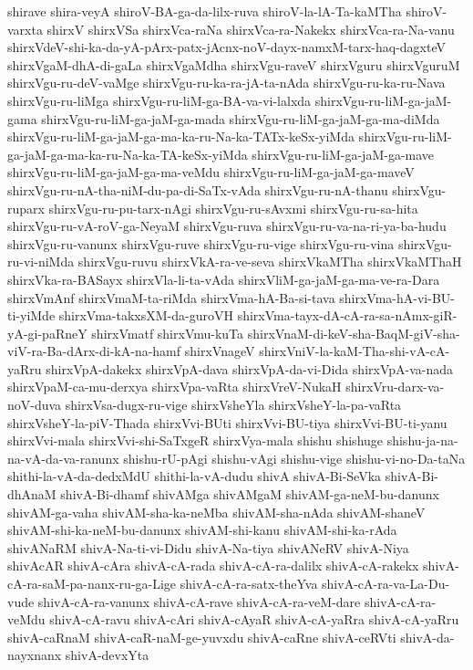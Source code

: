 {shirave
shira-veyA
shiroV-BA-ga-da-lilx-ruva
shiroV-la-lA-Ta-kaMTha
shiroV-varxta
shirxV
shirxVSa
shirxVca-raNa
shirxVca-ra-Nakekx
shirxVca-ra-Na-vanu
shirxVdeV-shi-ka-da-yA-pArx-patx-jAcnx-noV-dayx-namxM-tarx-haq-dagxteV
shirxVgaM-dhA-di-gaLa
shirxVgaMdha
shirxVgu-raveV
shirxVguru
shirxVguruM
shirxVgu-ru-deV-vaMge
shirxVgu-ru-ka-ra-jA-ta-nAda
shirxVgu-ru-ka-ru-Nava
shirxVgu-ru-liMga
shirxVgu-ru-liM-ga-BA-va-vi-lalxda
shirxVgu-ru-liM-ga-jaM-gama
shirxVgu-ru-liM-ga-jaM-ga-mada
shirxVgu-ru-liM-ga-jaM-ga-ma-diMda
shirxVgu-ru-liM-ga-jaM-ga-ma-ka-ru-Na-ka-TATx-keSx-yiMda
shirxVgu-ru-liM-ga-jaM-ga-ma-ka-ru-Na-ka-TA-keSx-yiMda
shirxVgu-ru-liM-ga-jaM-ga-mave
shirxVgu-ru-liM-ga-jaM-ga-ma-veMdu
shirxVgu-ru-liM-ga-jaM-ga-maveV
shirxVgu-ru-nA-tha-niM-du-pa-di-SaTx-vAda
shirxVgu-ru-nA-thanu
shirxVgu-ruparx
shirxVgu-ru-pu-tarx-nAgi
shirxVgu-ru-sAvxmi
shirxVgu-ru-sa-hita
shirxVgu-ru-vA-roV-ga-NeyaM
shirxVgu-ruva
shirxVgu-ru-va-na-ri-ya-ba-hudu
shirxVgu-ru-vanunx
shirxVgu-ruve
shirxVgu-ru-vige
shirxVgu-ru-vina
shirxVgu-ru-vi-niMda
shirxVgu-ruvu
shirxVkA-ra-ve-seva
shirxVkaMTha
shirxVkaMThaH
shirxVka-ra-BASayx
shirxVla-li-ta-vAda
shirxVliM-ga-jaM-ga-ma-ve-ra-Dara
shirxVmAnf
shirxVmaM-ta-riMda
shirxVma-hA-Ba-si-tava
shirxVma-hA-vi-BU-ti-yiMde
shirxVma-takxsXM-da-guroVH
shirxVma-tayx-dA-cA-ra-sa-nAmx-giR-yA-gi-paRneY
shirxVmatf
shirxVmu-kuTa
shirxVnaM-di-keV-sha-BaqM-giV-sha-viV-ra-Ba-dArx-di-kA-na-hamf
shirxVnageV
shirxVniV-la-kaM-Tha-shi-vA-cA-yaRru
shirxVpA-dakekx
shirxVpA-dava
shirxVpA-da-vi-Dida
shirxVpA-va-nada
shirxVpaM-ca-mu-derxya
shirxVpa-vaRta
shirxVreV-NukaH
shirxVru-darx-va-noV-duva
shirxVsa-dugx-ru-vige
shirxVsheYla
shirxVsheY-la-pa-vaRta
shirxVsheY-la-piV-Thada
shirxVvi-BUti
shirxVvi-BU-tiya
shirxVvi-BU-ti-yanu
shirxVvi-mala
shirxVvi-shi-SaTxgeR
shirxVya-mala
shishu
shishuge
shishu-ja-na-na-vA-da-va-ranunx
shishu-rU-pAgi
shishu-vAgi
shishu-vige
shishu-vi-no-Da-taNa
shithi-la-vA-da-dedxMdU
shithi-la-vA-dudu
shivA
shivA-Bi-SeVka
shivA-Bi-dhAnaM
shivA-Bi-dhamf
shivAMga
shivAMgaM
shivAM-ga-neM-bu-danunx
shivAM-ga-vaha
shivAM-sha-ka-neMba
shivAM-sha-nAda
shivAM-shaneV
shivAM-shi-ka-neM-bu-danunx
shivAM-shi-kanu
shivAM-shi-ka-rAda
shivANaRM
shivA-Na-ti-vi-Didu
shivA-Na-tiya
shivANeRV
shivA-Niya
shivAcAR
shivA-cAra
shivA-cA-rada
shivA-cA-ra-dalilx
shivA-cA-rakekx
shivA-cA-ra-saM-pa-nanx-ru-ga-Lige
shivA-cA-ra-satx-theYva
shivA-cA-ra-va-La-Du-vude
shivA-cA-ra-vanunx
shivA-cA-rave
shivA-cA-ra-veM-dare
shivA-cA-ra-veMdu
shivA-cA-ravu
shivA-cAri
shivA-cAyaR
shivA-cA-yaRra
shivA-cA-yaRru
shivA-caRnaM
shivA-caR-naM-ge-yuvxdu
shivA-caRne
shivA-ceRVti
shivA-da-nayxnanx
shivA-devxYta
}
